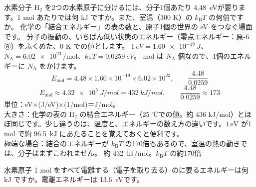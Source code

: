 \label{ph:原-7:ex10}
\begin{phreidai}[水素分子の結合のエネルギー]
水素分子 H$_2$ を2つの水素原子に分けるには、分子1個あたり \qty{4.48}{eV}が要ります。1 mol あたりでは何 kJ ですか。また、室温（300 K）の $k_{\mathrm B}T$ の何倍ですか。
\phbamen
化学の「結合エネルギー」の表の数と、原子1個の世界の eV をつなぐ場面です。
\phmushi
分子の振動の、いちばん低い状態のエネルギー（零点エネルギー：原-6 ⑧）をふくめた、0 K での値とします。
\phzu
$\qty{1}{eV}=\qty{1.60e-19}{J}$、$N_{\mathrm A}=\num{6.02e23}\,\mathrm{/mol}$、$k_{\mathrm B}T=\qty{0.0259}{eV}$。
 mol は $N_{\mathrm A}$ 個なので、1個のエネルギーに $N_{\mathrm A}$ をかけます。
\phtateru
\[ E_{\mathrm{mol}}=4.48\times1.60\times10^{-19}\times6.02\times10^{23},\qquad \frac{4.48}{0.0259} \]
\phtoku
\[ E_{\mathrm{mol}}\approx\qty{4.32e5}{J/mol}=\qty{432}{kJ/mol},\qquad \frac{4.48}{0.0259}\approx173 \]
\phtashikame
単位：eV×(J/eV)×(1/mol)＝J/mol。\\
大きさ：化学の表の H$_2$ の結合エネルギー（25 ℃での値。約 436 kJ/mol）とほぼ同じです。少し違うのは、温度と、エネルギーの数え方の違いです。$1\,\mathrm{eV}$ が1 mol で約 \qty{96.5}{kJ} にあたることを覚えておくと便利です。\\
極端な場合：結合のエネルギーが $k_{\mathrm B}T$ の170倍もあるので、室温の熱の動きでは、分子はまずこわれません。
\kotae 約 \qty{432}{kJ/mol}。$k_{\mathrm B}T$ の約170倍
\end{phreidai}
\begin{jibun}
水素原子 1 mol をすべて電離する（電子を取り去る）のに要るエネルギーは何 kJ ですか。電離エネルギーは \qty{13.6}{eV}です。
\end{jibun}

